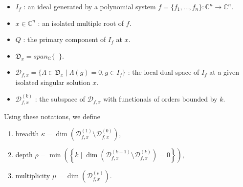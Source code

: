 \documentclass[12pt,oneside,reqno]{amsart}
\theoremstyle{definition}
\DeclareMathOperator{\diffop}{\mathbf{d}^\mathbf{\alpha}_x}
\begin{document}
\begin{itemize}
	\item $I_f$ : an ideal generated by a polynomial system $f=\{f_1,\dots, f_n\}:\mathbb{C}^n\rightarrow\mathbb{C}^n$.
	\item $x\in \mathbb{C}^n$ : an isolated multiple root of $f$.
	\item $Q$ : the primary component of $I_f$ at $x$.
	\item $\mathfrak{D}_x=span_\mathbb{C}\{\diffop\}$.
	\item $\mathcal{D}_{f,x}=\{\Lambda \in \mathfrak{D}_x \mid \Lambda(g)=0, g\in I_f\}$ : the local dual space of $I_f$ at a given isolated singular solution $x$.
	\item $\mathcal{D}_{f,x}^{(k)}$ : the subspace of $\mathcal{D}_{f,x}$ with functionals of orders bounded by $k$.
\end{itemize}
Using these notations, we define
\begin{enumerate}
	\item breadth $\kappa = \dim\left(\mathcal{D}_{f,x}^{(1)}\setminus\mathcal{D}_{f,x}^{(0)}\right)$,
	\item depth $\rho = \min\left(\left\{k\mid \dim\left(\mathcal{D}_{f,x}^{(k+1)}\setminus\mathcal{D}_{f,x}^{(k)}\right)=0\right\}\right)$,
	\item multiplicity $\mu = \dim \left(\mathcal{D}_{f,x}^{(\rho)}\right)$.
\end{enumerate}
\end{document}
